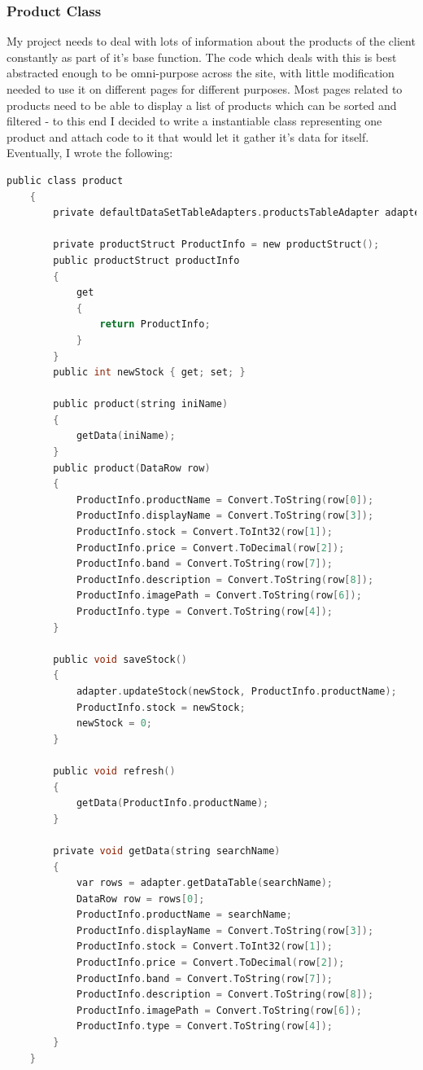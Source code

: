 ﻿\documentclass{article}
\begin{document}
    \subsubsection{Product Class}
    My project needs to deal with lots of information about the products of the client constantly as part of it's base function.
    The code which deals with this is best abstracted enough to be omni-purpose across the site, with little modification needed to use it on different pages for different purposes.
    Most pages related to products need to be able to display a list of products which can be sorted and filtered - to this end I decided to write a instantiable class representing one product and attach code to it that would let it gather it's data for itself.
    Eventually, I wrote the following:
    \begin{lstlisting}[language=C]
    public class product
    {
        private defaultDataSetTableAdapters.productsTableAdapter adapter = new defaultDataSetTableAdapters.productsTableAdapter();

        private productStruct ProductInfo = new productStruct();
        public productStruct productInfo
        {
            get
            {
                return ProductInfo;
            }
        }
        public int newStock { get; set; }

        public product(string iniName)
        {
            getData(iniName);
        }
        public product(DataRow row)
        {
            ProductInfo.productName = Convert.ToString(row[0]);
            ProductInfo.displayName = Convert.ToString(row[3]);
            ProductInfo.stock = Convert.ToInt32(row[1]);
            ProductInfo.price = Convert.ToDecimal(row[2]);
            ProductInfo.band = Convert.ToString(row[7]);
            ProductInfo.description = Convert.ToString(row[8]);
            ProductInfo.imagePath = Convert.ToString(row[6]);
            ProductInfo.type = Convert.ToString(row[4]);
        }
        
        public void saveStock()
        {
            adapter.updateStock(newStock, ProductInfo.productName);
            ProductInfo.stock = newStock;
            newStock = 0;
        }

        public void refresh()
        {
            getData(ProductInfo.productName);
        }

        private void getData(string searchName)
        {
            var rows = adapter.getDataTable(searchName);
            DataRow row = rows[0];
            ProductInfo.productName = searchName;
            ProductInfo.displayName = Convert.ToString(row[3]);
            ProductInfo.stock = Convert.ToInt32(row[1]);
            ProductInfo.price = Convert.ToDecimal(row[2]);
            ProductInfo.band = Convert.ToString(row[7]);
            ProductInfo.description = Convert.ToString(row[8]);
            ProductInfo.imagePath = Convert.ToString(row[6]);
            ProductInfo.type = Convert.ToString(row[4]);
        }
    }
    \end{lstlisting}
\end{document}
